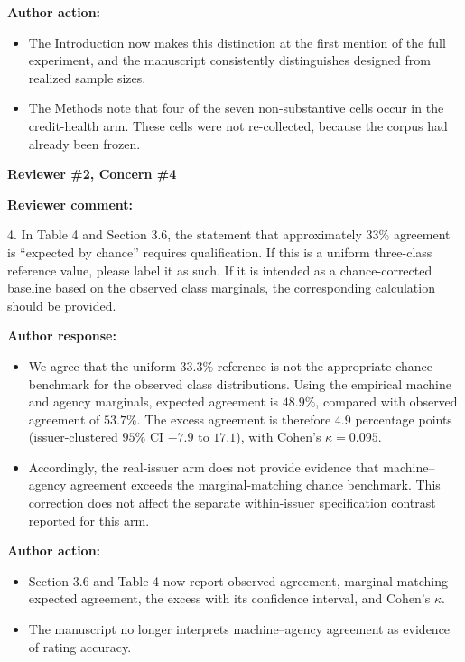 \documentclass[11pt]{article}
\newcommand{\rvcomment}[1]{{\color{ReviewerGreen}#1}}
\newcommand{\concern}[1]{\textbf{\color{ReviewerGreen}#1}}
\begin{document}
\textbf{Author action:}

\begin{itemize}
\item The Introduction now makes this distinction at the first mention of the full experiment, and the manuscript consistently distinguishes designed from realized sample sizes.
\item The Methods note that four of the seven non-substantive cells occur in the credit-health arm. These cells were not re-collected, because the corpus had already been frozen.
\end{itemize}

\vspace{4pt}

\concern{Reviewer \#2, Concern \#4}

\concern{Reviewer comment:}

\rvcomment{4. In Table 4 and Section 3.6, the statement that approximately 33\% agreement is
``expected by chance'' requires qualification. If this is a uniform three-class reference value,
please label it as such. If it is intended as a chance-corrected baseline based on the observed
class marginals, the corresponding calculation should be provided.}

\textbf{Author response:}

\begin{itemize}
\item We agree that the uniform $33.3\%$ reference is not the appropriate chance benchmark for the
observed class distributions. Using the empirical machine and agency marginals, expected agreement
is $48.9\%$, compared with observed agreement of $53.7\%$. The excess agreement is therefore $4.9$
percentage points (issuer-clustered $95\%$ CI $-7.9$ to $17.1$), with Cohen's $\kappa=0.095$.
\item Accordingly, the real-issuer arm does not provide evidence that machine--agency agreement exceeds
the marginal-matching chance benchmark. This correction does not affect the separate within-issuer
specification contrast reported for this arm.
\end{itemize}

\textbf{Author action:}

\begin{itemize}
\item Section 3.6 and Table 4 now report observed agreement, marginal-matching expected agreement, the excess with its confidence interval, and Cohen's $\kappa$.
\item The manuscript no longer interprets machine--agency agreement as evidence of rating accuracy.
\end{itemize}
\end{document}
